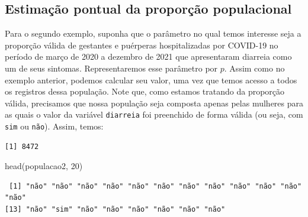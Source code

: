 \documentclass[
  letterpaper,
  DIV=11,
  numbers=noendperiod]{scrreprt}
\newenvironment{Shaded}{\begin{snugshade}}{\end{snugshade}}
\newcommand{\DecValTok}[1]{\textcolor[rgb]{0.68,0.00,0.00}{#1}}
\newcommand{\FunctionTok}[1]{\textcolor[rgb]{0.28,0.35,0.67}{#1}}
\newcommand{\NormalTok}[1]{\textcolor[rgb]{0.00,0.23,0.31}{#1}}
\newcommand{\OtherTok}[1]{\textcolor[rgb]{0.00,0.23,0.31}{#1}}
\newcommand{\SpecialCharTok}[1]{\textcolor[rgb]{0.37,0.37,0.37}{#1}}
\newcommand{\StringTok}[1]{\textcolor[rgb]{0.13,0.47,0.30}{#1}}
\begin{document}
\hypertarget{estimauxe7uxe3o-pontual-da-proporuxe7uxe3o-populacional}{%
\subsection{Estimação pontual da proporção
populacional}\label{estimauxe7uxe3o-pontual-da-proporuxe7uxe3o-populacional}}

Para o segundo exemplo, suponha que o parâmetro no qual temos interesse
seja a proporção válida de gestantes e puérperas hospitalizadas por
COVID-19 no período de março de 2020 a dezembro de 2021 que apresentaram
diarreia como um de seus sintomas. Representaremos esse parâmetro por
\(p\). Assim como no exemplo anterior, podemos calcular seu valor, uma
vez que temos acesso a todos os registros dessa população. Note que,
como estamos tratando da proporção válida, precisamos que nossa
população seja composta apenas pelas mulheres para as quais o valor da
variável \texttt{diarreia} foi preenchido de forma válida (ou seja, com
\texttt{sim} ou \texttt{não}). Assim, temos:

\begin{Shaded}
\end{Shaded}

\begin{verbatim}
[1] 8472
\end{verbatim}

\begin{Shaded}
\begin{Highlighting}[]
\FunctionTok{head}\NormalTok{(populacao2, }\DecValTok{20}\NormalTok{)}
\end{Highlighting}
\end{Shaded}

\begin{verbatim}
 [1] "não" "não" "não" "não" "não" "não" "não" "não" "não" "não" "não" "não"
[13] "não" "sim" "não" "não" "não" "não" "não" "não"
\end{verbatim}
\end{document}
